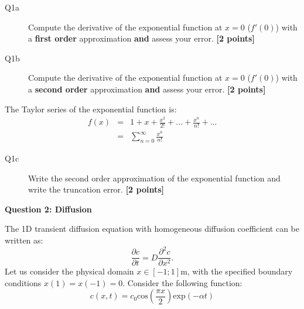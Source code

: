 \documentclass{article}
\begin{document}
\begin{description}
\item [Q1a] Compute the derivative of the exponential function at $x = 0$ ($f'(0)$) with a \textbf{first order} approximation \textbf{and} assess your error.  \textbf{[2 points]}
\vspace{3cm}
\item [Q1b] Compute the derivative of the exponential function at $x = 0$ ($f'(0)$) with a \textbf{second order} approximation \textbf{and} assess your error.  \textbf{[2 points]}
\vspace{3cm}

\end{description}

The Taylor series of the exponential function is:
\begin{equation}
\begin{array}{lll}
f(x) & = & 1 + x + \frac{x^2}{2!} + ... + \frac{x^n}{n!} + ... \\ 
 & = & \displaystyle{\sum_{n=0}^{\infty}\frac{x^n}{n!}}
 \end{array}
\label{eq:expTay}
\end{equation} 

\begin{description}
\item [Q1c] Write the second order approximation of the exponential function and write the truncation error. \textbf{[2 points]}
\vspace{3cm}
\end{description}



\textbf{Question 2: Diffusion}

The 1D transient diffusion equation with homogeneous diffusion coefficient can be written as:
\begin{equation}
\frac{\partial c}{\partial t} = D \frac{\partial^2 c}{\partial x^2}. \label{eq:diff}
\end{equation} Let us consider the physical domain $ x \in \left[ -1 ; 1 \right] \mathrm{m}$, with the specified boundary conditions $x(1) = x(-1) = 0$. Consider the following function:
\begin{equation}
c(x,t) = c_0 \mathrm{cos}\left(\frac{\pi x}{2} \right) \mathrm{exp}\left(-\alpha t \right)  \label{eq:sol}
\end{equation}
\end{document}

